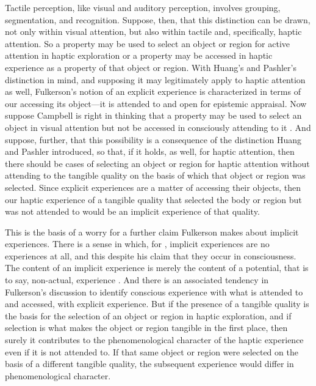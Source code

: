 Tactile perception, like visual and auditory perception, involves grouping, segmentation, and recognition. Suppose, then, that this distinction can be drawn, not only within visual attention, but also within tactile and, specifically, haptic attention. So a property may be used to select an object or region for active attention in haptic exploration or a property may be accessed in haptic experience as a property of that object or region. With Huang's and Pashler's distinction in mind, and supposing it may legitimately apply to haptic attention as well, Fulkerson's notion of an explicit experience is characterized in terms of our accessing its object---it is attended to and open for epistemic appraisal. Now suppose Campbell is right in thinking that a property may be used to select an object in visual attention but not be accessed in consciously attending to it \citep[chapter 3.2]{Campbell:2014aa}. And suppose, further, that this possibility is a consequence of the distinction Huang and Pashler introduced, so that, if it holds, as well, for haptic attention, then there should be cases of selecting an object or region for haptic attention without attending to the tangible quality on the basis of which that object or region was selected. Since explicit experiences are a matter of accessing their objects, then our haptic experience of a tangible quality that selected the body or region but was not attended to would be an implicit experience of that quality.

This is the basis of a worry for a further claim Fulkerson makes about implicit experiences. There is a sense in which, for \citet[91]{Fulkerson:2014ek}, implicit experiences are no experiences at all, and this despite his claim that they occur in consciousness. The content of an implicit experience is merely the content of a potential, that is to say, non-actual, experience \citep[95]{Fulkerson:2014ek}. And there is an associated tendency in Fulkerson's discussion to identify conscious experience with what is attended to and accessed, with explicit experience. But if the presence of a tangible quality is the basis for the selection of an object or region in haptic exploration, and if selection is what makes the object or region tangible in the first place, then surely it contributes to the phenomenological character of the haptic experience even if it is not attended to. If that same object or region were selected on the basis of a different tangible quality, the subsequent experience would differ in phenomenological character. 

